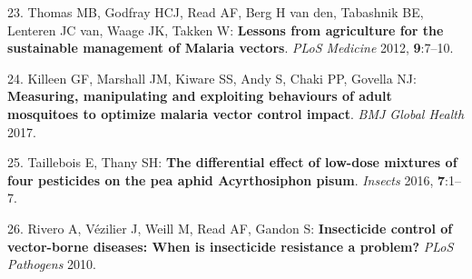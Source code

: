 \documentclass[11pt,]{article}
\begin{document}
\hypertarget{ref-Thomas2012}{}
23. Thomas MB, Godfray HCJ, Read AF, Berg H van den, Tabashnik BE,
Lenteren JC van, Waage JK, Takken W: \textbf{Lessons from agriculture
for the sustainable management of Malaria vectors}. \emph{PLoS Medicine}
2012, \textbf{9}:7--10.

\hypertarget{ref-Killeen2017}{}
24. Killeen GF, Marshall JM, Kiware SS, Andy S, Chaki PP, Govella NJ:
\textbf{Measuring, manipulating and exploiting behaviours of adult
mosquitoes to optimize malaria vector control impact}. \emph{BMJ Global
Health} 2017.

\hypertarget{ref-Taillebois2016}{}
25. Taillebois E, Thany SH: \textbf{The differential effect of low-dose
mixtures of four pesticides on the pea aphid Acyrthosiphon pisum}.
\emph{Insects} 2016, \textbf{7}:1--7.

\hypertarget{ref-Rivero2010}{}
26. Rivero A, Vézilier J, Weill M, Read AF, Gandon S:
\textbf{Insecticide control of vector-borne diseases: When is
insecticide resistance a problem?} \emph{PLoS Pathogens} 2010.
\end{document}
